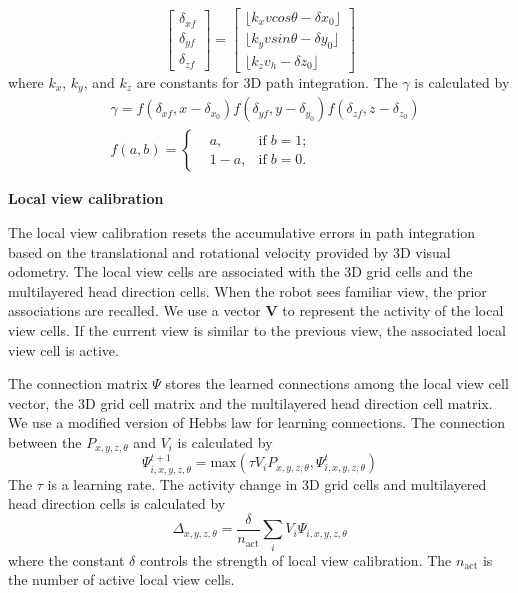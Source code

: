 \begin{equation}
	\left[
		\begin{matrix}
			\delta_{xf} \\
			\delta_{yf} \\
			\delta_{zf}
		\end{matrix}
	\right]
	=
	\left[
		\begin{matrix}
			\lfloor k_x v cos\theta - \delta x_0 \rfloor \\
			\lfloor k_y v sin\theta - \delta y_0 \rfloor \\
			\lfloor k_z v_h - \delta z_0 \rfloor
		\end{matrix}
	\right]
\end{equation}
%
where $k_x$, $k_y$, and $k_z$ are constants for 3D path integration. 
The $\gamma$ is calculated by
%
\begin{equation}
	\begin{aligned}
		& \gamma = 
			f(\delta_{xf}, x-\delta_{x_0})
			f(\delta_{yf}, y - \delta_{y_0})
			f(\delta_{zf}, z-\delta_{z_0}) \\
		& f(a,b) = 
			\left\{
				\begin{aligned}
					& a,  & \text{if} \; b=1;\\
					& 1-a, & \text{if} \; b=0.
				\end{aligned}
			\right.
	\end{aligned}
\end{equation}


\textbf{Local view calibration}

The local view calibration resets the accumulative errors in path integration based on the translational and rotational velocity provided by 3D visual odometry. 
The local view cells are associated with the 3D grid cells and the multilayered head direction cells. 
When the robot sees familiar view, the prior associations are recalled. 
We use a vector \textbf{V} to represent the activity of the local view cells. 
If the current view is similar to the previous view, the associated local view cell is active.


The connection matrix $\Psi$ stores the learned connections among the local view cell vector, the 3D grid cell matrix and the multilayered head direction cell matrix. 
We use a modified version of Hebbs law for learning connections. The connection between the $P_{x,y,z,\theta}$ and $V_i$ is calculated by
%
\begin{equation}
	\Psi_{i,x,y,z,\theta}^{t+1} = 
		\text{max}(
			\tau V_i P_{x,y,z,\theta},
			\Psi_{i,x,y,z,\theta}^{t}
		)
\end{equation}
% 
The $\tau$ is a learning rate. 
The activity change in 3D grid cells and multilayered head direction cells is calculated by
\begin{equation}
	\Delta_{x,y,z,\theta} = 
		\frac{\delta}{n_\text{act}}
		\sum_{i}
			V_i
			\Psi_{i,x,y,z,\theta}
\end{equation}
where the constant $\delta$ controls the strength of local view calibration. 
The $n_\text{act}$ is the number of active local view cells.


